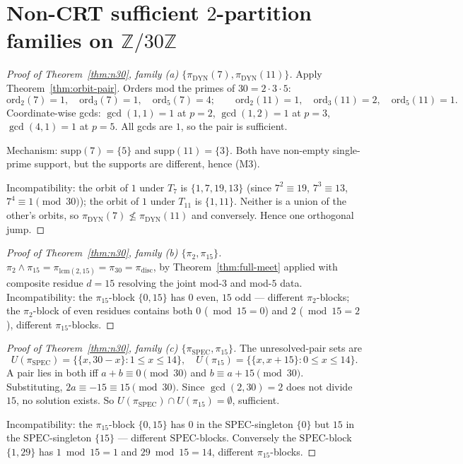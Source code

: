 \documentclass[11pt,reqno]{amsart}
\theoremstyle{plain}
\theoremstyle{definition}
\newcommand{\Z}{\mathbb{Z}}
\newcommand{\meet}{\wedge}
\newcommand{\disc}{\mathrm{disc}}
\newcommand{\DYN}{\mathrm{DYN}}
\newcommand{\SPEC}{\mathrm{SPEC}}
\newcommand{\supp}{\mathrm{supp}}
\newcommand{\ord}{\mathrm{ord}}
\newcommand{\lcm}{\mathrm{lcm}}
\begin{document}
\section{Non-CRT sufficient $2$-partition families on $\Z/30\Z$}

\begin{proof}[Proof of Theorem~\ref{thm:n30}, family (a) $\{\pi_{\DYN}(7), \pi_{\DYN}(11)\}$]
Apply Theorem~\ref{thm:orbit-pair}. Orders mod the primes of $30 = 2 \cdot 3 \cdot 5$:
\[
\ord_2(7) = 1, \quad \ord_3(7) = 1, \quad \ord_5(7) = 4; \qquad
\ord_2(11) = 1, \quad \ord_3(11) = 2, \quad \ord_5(11) = 1.
\]
Coordinate-wise gcds: $\gcd(1, 1) = 1$ at $p = 2$, $\gcd(1, 2) = 1$ at $p = 3$, $\gcd(4, 1) = 1$ at $p = 5$. All gcds are $1$, so the pair is sufficient.

Mechanism: $\supp(7) = \{5\}$ and $\supp(11) = \{3\}$. Both have non-empty single-prime support, but the supports are different, hence (M3).

Incompatibility: the orbit of $1$ under $T_7$ is $\{1, 7, 19, 13\}$ (since $7^2 \equiv 19$, $7^3 \equiv 13$, $7^4 \equiv 1 \pmod{30}$); the orbit of $1$ under $T_{11}$ is $\{1, 11\}$. Neither is a union of the other's orbits, so $\pi_{\DYN}(7) \not\leq \pi_{\DYN}(11)$ and conversely. Hence one orthogonal jump.
\end{proof}

\begin{proof}[Proof of Theorem~\ref{thm:n30}, family (b) $\{\pi_2, \pi_{15}\}$]
$\pi_2 \meet \pi_{15} = \pi_{\lcm(2, 15)} = \pi_{30} = \pi_{\disc}$, by Theorem~\ref{thm:full-meet} applied with composite residue $d = 15$ resolving the joint mod-$3$ and mod-$5$ data. Incompatibility: the $\pi_{15}$-block $\{0, 15\}$ has $0$ even, $15$ odd --- different $\pi_2$-blocks; the $\pi_2$-block of even residues contains both $0$ ($\bmod 15 = 0$) and $2$ ($\bmod 15 = 2$), different $\pi_{15}$-blocks.
\end{proof}

\begin{proof}[Proof of Theorem~\ref{thm:n30}, family (c) $\{\pi_{\SPEC}, \pi_{15}\}$]
The unresolved-pair sets are
\[
U(\pi_{\SPEC}) = \{\{x, 30 - x\} : 1 \leq x \leq 14\}, \quad U(\pi_{15}) = \{\{x, x + 15\} : 0 \leq x \leq 14\}.
\]
A pair lies in both iff $a + b \equiv 0 \pmod{30}$ and $b \equiv a + 15 \pmod{30}$. Substituting, $2a \equiv -15 \equiv 15 \pmod{30}$. Since $\gcd(2, 30) = 2$ does not divide $15$, no solution exists. So $U(\pi_{\SPEC}) \cap U(\pi_{15}) = \emptyset$, sufficient.

Incompatibility: the $\pi_{15}$-block $\{0, 15\}$ has $0$ in the $\SPEC$-singleton $\{0\}$ but $15$ in the $\SPEC$-singleton $\{15\}$ --- different $\SPEC$-blocks. Conversely the $\SPEC$-block $\{1, 29\}$ has $1 \bmod 15 = 1$ and $29 \bmod 15 = 14$, different $\pi_{15}$-blocks.
\end{proof}
\end{document}
